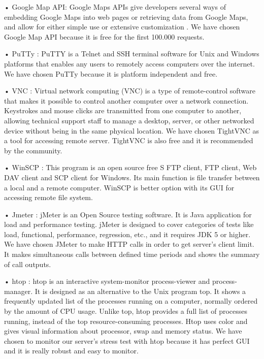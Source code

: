 • Google Map API: Google Maps APIs give developers several ways of embedding Google Maps into web pages or retrieving data from Google Maps, and allow for either simple use or extensive customization \cite{googleMapAPI}. 
We have chosen Google Map API because it is free for the first 100.000 requests.

• PuTTy : PuTTY is a Telnet and SSH terminal software for Unix and Windows platforms that enables any users to remotely access computers over the internet. 
\cite{PuttyTanim}
We have chosen PuTTy because it is platform independent and free.

• VNC : Virtual network computing (VNC) is a type of remote-control software that makes it possible to control another computer over a network connection. Keystrokes and mouse clicks are transmitted from one computer to another, allowing technical support staff to manage a desktop, server, or other networked device without being in the same physical location. 
\cite{VNCTanim}
We have chosen TightVNC as a tool for accessing remote server. TightVNC is also free and it is recommended by the community.

• WinSCP : This program is an open source free S FTP client, FTP client, Web DAV client and SCP client for Windows. Its main function is file transfer between a local and a remote computer.
\cite{WinSCPTanim}
 WinSCP is better option with its GUI for accessing remote file system. 
 
• Jmeter : jMeter is an Open Source testing software. It is Java application for load and performance testing. jMeter is designed to cover categories of tests like load, functional, performance, regression, etc., and it requires JDK 5 or higher. \cite{JMeterTanim}
We have chosen JMeter to make HTTP calls in order to get server's client limit. It makes simultaneous calls between defined time periods and shows the summary of call outputs.

• htop : htop is an interactive system-monitor process-viewer and process-manager. It is designed as an alternative to the Unix program top. It shows a frequently updated list of the processes running on a computer, normally ordered by the amount of CPU usage. Unlike top, htop provides a full list of processes running, instead of the top resource-consuming processes. Htop uses color and gives visual information about processor, swap and memory status.\cite{htopTanim}
We have chosen to monitor our server's stress test with htop because it has perfect GUI and it is really robust and easy to monitor.

